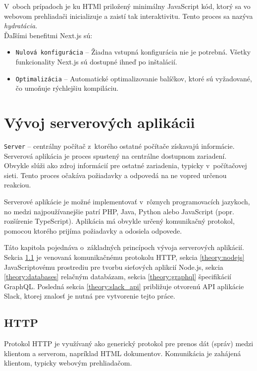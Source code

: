 \noindent V~oboch prípadoch je ku HTMl priložený minimálny JavaScript kód, ktorý sa vo webovom prehliadači inicializuje a zaistí tak interaktivitu. Tento proces sa nazýva \emph{hydratácia}. \cite{NextJS} \\

\noindent Ďaľšími benefitmi Next.js sú:
\begin{itemize}
	\item \texttt{Nulová konfigurácia} -- Žiadna vstupná konfigurácia nie je potrebná. Všetky funkcionality Next.js sú dostupné ihneď po inštalácií. \cite{NextJS}
	\item \texttt{Optimalizácia} -- Automatické optimalizovanie balíčkov, ktoré sú vyžadované, čo umoňuje rýchlejšiu kompiláciu. \cite{NextJS}
\end{itemize}

\chapter{Vývoj serverových aplikácii}
\label{theory:server_dev}
\texttt{Server} -- centrálny počítač z~ktorého ostatné počítače získavajú informácie. \cite{CamDict} \\

\noindent Serverová aplikácia je proces spustený na centrálne dostupnom zariadení. Obvykle slúži ako zdroj informácií pre ostatné zariadenia, typicky v~počítačovej sieti. Tento proces očakáva požiadavky a odpovedá na ne vopred určenou reakciou.

Serverové aplikácie je možné implementovať v~rôznych programovacích jazykoch, no medzi najpoužívanejšie patrí PHP, Java, Python alebo JavaScript (popr. rozšírenie TypeScript). Aplikácia má obvykle určený komunikačný protokol, pomocou ktorého prijíma požiadavky a odosiela odpovede.

Táto kapitola pojednáva o~základných princípoch vývoja serverových aplikácií. Sekcia \ref{theory:HTTP} je venovaná komunikačnému protokolu HTTP, sekcia \ref{theory:nodejs} JavaScriptovému prostrediu pre tvorbu sieťových aplikcií Node.js, sekcia \ref{theory:databases} relačným databázam, sekcia \ref{theory:graphql} špecifikácií GraphQL. Posledná sekcia \ref{theory:slack_api} približuje otvorenú API aplikácie Slack, ktorej znalosť je nutná pre vytvorenie tejto práce.

\section{HTTP}
\label{theory:HTTP}
Protokol HTTP je využívaný ako generický protokol pre prenos dát (správ) medzi klientom a serverom, napríklad HTML dokumentov. Komunikácia je zahájená klientom, typicky webovým prehliadačom.

